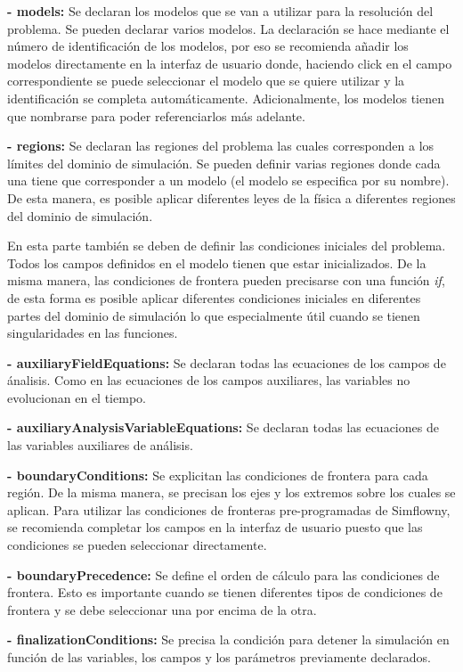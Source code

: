 \documentclass[11pt]{article}
\begin{document}
{\bf - models:}
Se declaran los modelos que se van a utilizar para la resolución del problema. Se pueden declarar varios modelos. La declaración se hace mediante el número de identificación de los modelos, por eso se recomienda añadir los modelos directamente en la interfaz de usuario donde, haciendo click en el campo correspondiente se puede seleccionar el modelo que se quiere utilizar y la identificación se completa automáticamente. Adicionalmente, los modelos tienen que nombrarse para poder referenciarlos más adelante.

{\bf - regions:}
Se declaran las regiones del problema las cuales corresponden a los límites del dominio de simulación. Se pueden definir varias regiones donde cada una tiene que corresponder a un modelo (el modelo se especifica por su nombre). De esta manera, es posible aplicar diferentes leyes de la física a diferentes regiones del dominio de simulación.

En esta parte también se deben de definir las condiciones iniciales del problema. Todos los campos definidos en el modelo tienen que estar inicializados. De la misma manera, las condiciones de frontera pueden precisarse con una función {\itshape if}, de esta forma es posible aplicar diferentes condiciones iniciales en diferentes partes del dominio de simulación  lo que especialmente útil cuando se tienen singularidades en las funciones.

{\bf - auxiliaryFieldEquations:}
Se declaran todas las ecuaciones de los campos de ánalisis. Como en las ecuaciones de los campos auxiliares, las variables no evolucionan en el tiempo.

{\bf - auxiliaryAnalysisVariableEquations:}
Se declaran todas las ecuaciones de las variables auxiliares de análisis.

{\bf - boundaryConditions:}
Se explicitan las condiciones de frontera para cada región. De la misma manera, se precisan los ejes y los extremos sobre los cuales se aplican. Para utilizar las condiciones de fronteras pre-programadas de Simflowny, se recomienda completar los campos en la interfaz de usuario puesto que las condiciones se pueden seleccionar directamente.

{\bf - boundaryPrecedence:}
Se define el orden de cálculo para las condiciones de frontera. Esto es importante cuando se tienen diferentes tipos de condiciones de frontera y se debe seleccionar una por encima de la otra.

{\bf - finalizationConditions:}
Se precisa la condición para detener la simulación en función de las variables, los campos y los parámetros previamente declarados.
\end{document}
